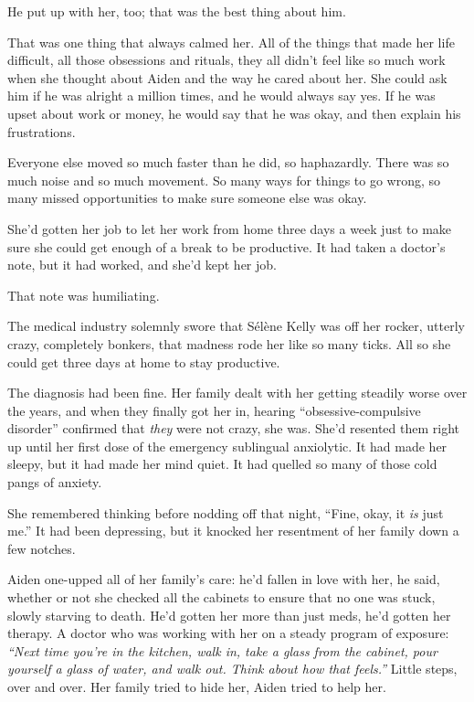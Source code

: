 He put up with her, too; that was the best thing about him.

That was one thing that always calmed her. All of the things that made her life difficult, all those obsessions and rituals, they all didn't feel like so much work when she thought about Aiden and the way he cared about her. She could ask him if he was alright a million times, and he would always say yes. If he was upset about work or money, he would say that he was okay, and then explain his frustrations.

Everyone else moved so much faster than he did, so haphazardly. There was so much noise and so much movement. So many ways for things to go wrong, so many missed opportunities to make sure someone else was okay.

She'd gotten her job to let her work from home three days a week just to make sure she could get enough of a break to be productive. It had taken a doctor's note, but it had worked, and she'd kept her job.

That note was humiliating.

The medical industry solemnly swore that Sélène Kelly was off her rocker, utterly crazy, completely bonkers, that madness rode her like so many ticks. All so she could get three days at home to stay productive.

The diagnosis had been fine. Her family dealt with her getting steadily worse over the years, and when they finally got her in, hearing ``obsessive-compulsive disorder'' confirmed that \emph{they} were not crazy, she was. She'd resented them right up until her first dose of the emergency sublingual anxiolytic. It had made her sleepy, but it had made her mind quiet. It had quelled so many of those cold pangs of anxiety.

She remembered thinking before nodding off that night, ``Fine, okay, it \emph{is} just me.'' It had been depressing, but it knocked her resentment of her family down a few notches.

Aiden one-upped all of her family's care: he'd fallen in love with her, he said, whether or not she checked all the cabinets to ensure that no one was stuck, slowly starving to death. He'd gotten her more than just meds, he'd gotten her therapy. A doctor who was working with her on a steady program of exposure: \emph{``Next time you're in the kitchen, walk in, take a glass from the cabinet, pour yourself a glass of water, and walk out. Think about how that feels.''} Little steps, over and over. Her family tried to hide her, Aiden tried to help her.

